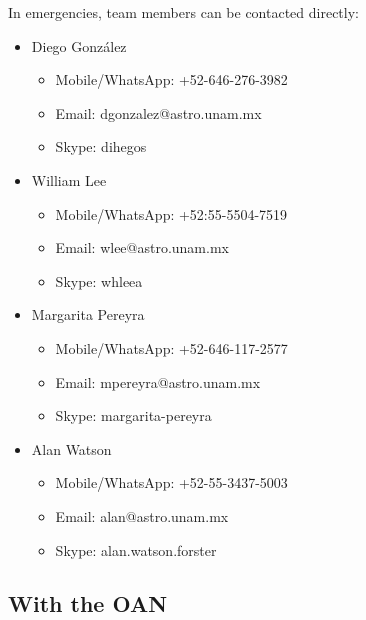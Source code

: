 \documentclass{article}
\begin{document}
In emergencies, team members can be contacted directly:

\begin{itemize}
\item
Diego González
\begin{itemize}
\item Mobile/WhatsApp: +52-646-276-3982
\item Email: dgonzalez@astro.unam.mx
\item Skype: dihegos
\end{itemize}
\item
William Lee
\begin{itemize}
\item Mobile/WhatsApp: +52:55-5504-7519
\item Email: wlee@astro.unam.mx
\item Skype: whleea
\end{itemize}
\item
Margarita Pereyra
\begin{itemize}
\item Mobile/WhatsApp: +52-646-117-2577
\item Email: mpereyra@astro.unam.mx
\item Skype: margarita-pereyra
\end{itemize}
\item
Alan Watson
\begin{itemize}
\item Mobile/WhatsApp: +52-55-3437-5003
\item Email: alan@astro.unam.mx
\item Skype: alan.watson.forster
\end{itemize}
\end{itemize}

\subsection{With the OAN}
\end{document}
